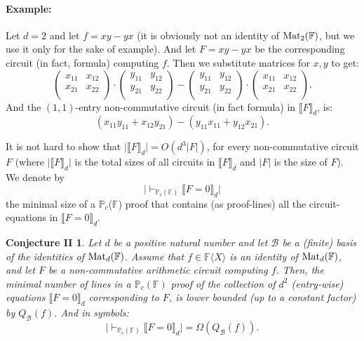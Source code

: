 \documentclass[12pt,reqno]{article}
\newtheorem*{main-open}{Conjecture II}
\newcommand\F{\ensuremath{\mathbb F}}
\newcommand\PP{{\mathbb P}}
\newcommand\PC{\ensuremath{\PP_c}}
\newcommand{\cd}{\cdot}
\newcommand {\para}[1] {\paragraph{#1}}
\newcommand{\matd}{{\ensuremath{{\rm Mat}_d(\F)}}}
\newcommand{\mattwo}{{\ensuremath{{\rm Mat}_2(\F)}}}
\newcommand{\freea}{\ensuremath{\F\langle X\rangle}}
\newcommand{\convert}[1]{\llbracket#1\rrbracket_d}
\begin{document}
\para{Example:} Let $d=2$ and let $f=xy-yx$ (it is obviously not an identity of \mattwo, but we use it only for the sake of example). And let $F=xy-yx$ be the corresponding circuit (in fact, formula) computing $f$. Then we substitute matrices for $x,y$ to get:
$$\begin{pmatrix}x_{11} & x_{12} \\
x_{21} & x_{22} \\
\end{pmatrix} \cd
\begin{pmatrix}y_{11} & y_{12} \\
y_{21} & y_{22} \\
\end{pmatrix}
-
\begin{pmatrix}y_{11} & y_{12} \\
y_{21} & y_{22} \\
\end{pmatrix}
\cd
\begin{pmatrix}x_{11} & x_{12} \\
x_{21} & x_{22} \\
\end{pmatrix}.$$
And the $(1,1)$-entry non-commutative circuit (in fact formula) in  \(\convert{F}\), is:
$$(x_{11}y_{11}+x_{12}y_{21})-(y_{11}x_{11}+y_{12}x_{21}).$$

It is not hard to show that $\big|\convert{F}\big|=O\left(d^3 |F| \right)$, for every non-commutative circuit $F$ (where
$\big|\convert{F}\big|$ is the total sizes of all circuits in $\convert{F}$ and $|F|$ is the size of $F$).
We denote by
$$\big|\vdash_{\PC(\F)}\convert{F=0}\big|$$ the minimal size of a \PC(\F) proof that contains (as proof-lines) all the
circuit-equations in $\convert{F=0}$.


\bigskip

\begin{boxedminipage}[c]{1\textwidth}
\begin{main-open}  Let $d$ be a positive natural number and let $ \mathcal B$ be a (finite) basis of the  identities of \matd. Assume that $f\in\freea$ is an identity of \matd, and let $F$ be a non-commutative arithmetic circuit computing $f$. Then, the minimal number of lines in a $\PC(\F)$ proof of the collection of  $d^2$ (entry-wise) equations $\llbracket F=0 \rrbracket_d$  corresponding to $F$, is lower bounded (up to a constant factor) by $Q_{\mathcal  B}(f)$. And in symbols:
\begin{equation}\label{eq:main-open-prob}
\big|\vdash_{\PC(\F)}\convert{F=0}\big| = \Omega(Q_{\mathcal B}(f)).
\end{equation}
\end{main-open}
\end{boxedminipage}
\bigskip
\end{document}
